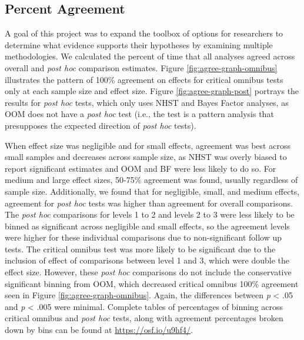 \documentclass[english,man]{apa6}
\theoremstyle{definition}
\theoremstyle{definition}
\theoremstyle{definition}
\theoremstyle{remark}
\begin{document}
\subsection{Percent Agreement}\label{percent-agreement}

A goal of this project was to expand the toolbox of options for
researchers to determine what evidence supports their hypotheses by
examining multiple methodologies. We calculated the percent of time that
all analyses agreed across overall and \emph{post hoc} comparison
estimates. Figure \ref{fig:agree-graph-omnibus} illustrates the pattern
of 100\% agreement on effects for critical omnibus tests only at each
sample size and effect size. Figure \ref{fig:agree-graph-post} portrays
the results for \emph{post hoc} tests, which only uses NHST and Bayes
Factor analyses, as OOM does not have a \emph{post hoc} test (i.e., the
test is a pattern analysis that presupposes the expected direction of
\emph{post hoc} tests).

When effect size was negligible and for small effects, agreement was
best across small samples and decreases across sample size, as NHST was
overly biased to report significant estimates and OOM and BF were less
likely to do so. For medium and large effect sizes, 50-75\% agreement
was found, usually regardless of sample size. Additionally, we found
that for negligible, small, and medium effects, agreement for \emph{post
hoc} tests was higher than agreement for overall comparisons. The
\emph{post hoc} comparisons for levels 1 to 2 and levels 2 to 3 were
less likely to be binned as significant across negligible and small
effects, so the agreement levels were higher for these individual
comparisons due to non-significant follow up tests. The critical omnibus
test was more likely to be significant due to the inclusion of effect of
comparisons between level 1 and 3, which were double the effect size.
However, these \emph{post hoc} comparisons do not include the
conservative significant binning from OOM, which decreased critical
omnibus 100\% agreement seen in Figure \ref{fig:agree-graph-omnibus}.
Again, the differences between \emph{p} \textless{} .05 and \emph{p}
\textless{} .005 were minimal. Complete tables of percentages of binning
across critical omnibus and \emph{post hoc} tests, along with agreement
percentages broken down by bins can be found at
\url{https://osf.io/u9hf4/}.
\end{document}
